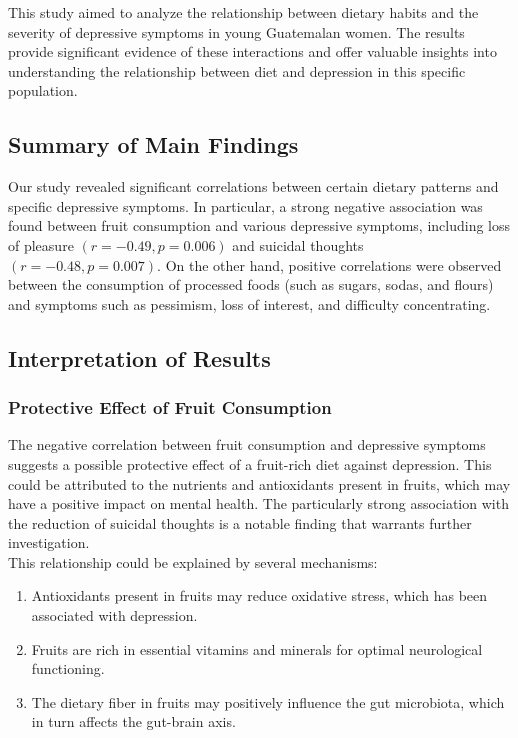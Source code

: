 \documentclass[jou]{apa7}
\begin{document}
This study aimed to analyze the relationship between dietary habits and the severity of depressive symptoms in young Guatemalan women. The results provide significant evidence of these interactions and offer valuable insights into understanding the relationship between diet and depression in this specific population.

\subsection{Summary of Main Findings}\label{resumen-de-hallazgos-principales}

Our study revealed significant correlations between certain dietary patterns and specific depressive symptoms. In particular, a strong negative association was found between fruit consumption and various depressive symptoms, including loss of pleasure $(r = -0.49, p = 0.006)$ and suicidal thoughts $(r = -0.48, p = 0.007)$. On the other hand, positive correlations were observed between the consumption of processed foods (such as sugars, sodas, and flours) and symptoms such as pessimism, loss of interest, and difficulty concentrating.\\

\subsection{Interpretation of Results}\label{interpretaciuxf3n-de-resultados}

\subsubsection{Protective Effect of Fruit Consumption}

The negative correlation between fruit consumption and depressive symptoms suggests a possible protective effect of a fruit-rich diet against depression. This could be attributed to the nutrients and antioxidants present in fruits, which may have a positive impact on mental health. The particularly strong association with the reduction of suicidal thoughts is a notable finding that warrants further investigation.\\

This relationship could be explained by several mechanisms:

\begin{enumerate}
	\item Antioxidants present in fruits may reduce oxidative stress, which has been associated with depression.\\

	\item Fruits are rich in essential vitamins and minerals for optimal neurological functioning.\\

	\item The dietary fiber in fruits may positively influence the gut microbiota, which in turn affects the gut-brain axis.
\end{enumerate}
\end{document}
